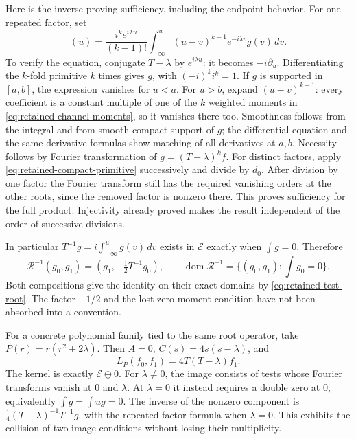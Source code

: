 Here is the inverse proving sufficiency, including the endpoint behavior.
For one repeated factor, set
\begin{equation}
 [(T-\lambda)^{-k}g](u)
 =\frac{i^k e^{i\lambda u}}{(k-1)!}
   \int_{-\infty}^u (u-v)^{k-1}e^{-i\lambda v}g(v)\,dv.
 \label{eq:retained-compact-primitive}
\end{equation}
To verify the equation, conjugate $T-\lambda$ by $e^{i\lambda u}$:
it becomes $-i\partial_u$. Differentiating the $k$-fold primitive
$k$ times gives $g$, with $(-i)^ki^k=1$.
If $g$ is supported in $[a,b]$, the expression vanishes for $u<a$.
For $u>b$, expand $(u-v)^{k-1}$: every coefficient is a constant
multiple of one of the $k$ weighted moments in
\eqref{eq:retained-channel-moments}, so it vanishes there too.
Smoothness follows from the integral and from smooth compact support
of $g$; the differential equation and the same derivative formulas
show matching of all derivatives at $a,b$.
Necessity follows by Fourier transformation of
$g=(T-\lambda)^kf$. For distinct factors, apply
\eqref{eq:retained-compact-primitive} successively and divide by
$d_0$. After division by one factor the Fourier transform still has
the required vanishing orders at the other roots, since the removed
factor is nonzero there. This proves sufficiency for the full product.
Injectivity already proved makes the result independent of the order
of successive divisions.

In particular $T^{-1}g=i\int_{-\infty}^u g(v)\,dv$ exists in
$\mathcal E$ exactly when $\int g=0$. Therefore
\begin{equation}
 \mathcal R^{-1}(g_0,g_1)
   =(g_1,-\tfrac12 T^{-1}g_0),\qquad
 \operatorname{dom}\mathcal R^{-1}
   =\{(g_0,g_1):\textstyle\int g_0=0\}.
 \label{eq:retained-root-inverse-domain}
\end{equation}
Both compositions give the identity on their exact domains by
\eqref{eq:retained-test-root}. The factor $-1/2$ and the lost
zero-moment condition have not been absorbed into a convention.

For a concrete polynomial family tied to the same root operator, take
$P(r)=r(r^2+2\lambda)$. Then $A=0$,
$C(s)=4s(s-\lambda)$, and
\[
 L_P(f_0,f_1)=4T(T-\lambda)f_1.
\]
The kernel is exactly $\mathcal E\oplus0$. For $\lambda\ne0$,
the image consists of tests whose Fourier transforms vanish at $0$
and $\lambda$. At $\lambda=0$ it instead requires a double zero at
$0$, equivalently $\int g=\int ug=0$.
The inverse of the nonzero component is
$\tfrac14(T-\lambda)^{-1}T^{-1}g$, with the repeated-factor
formula when $\lambda=0$. This exhibits the collision of two image
conditions without losing their multiplicity.

